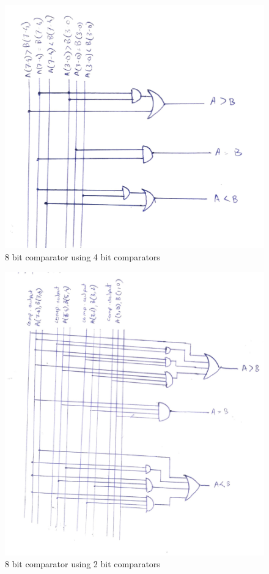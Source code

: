 \documentclass[titlepage]{article}
\begin{document}
    \begin{figure}[!ht]
        \centering
        \includegraphics[width=12cm]{./figures/8bit_4bit.jpeg}
        \caption{8 bit comparator using 4 bit comparators}
    \end{figure}
    \begin{figure}[!ht]
        \centering
        \includegraphics[width=12cm]{./figures/8bit_2bit.jpeg}
        \caption{8 bit comparator using 2 bit comparators}
    \end{figure}
\end{document}

